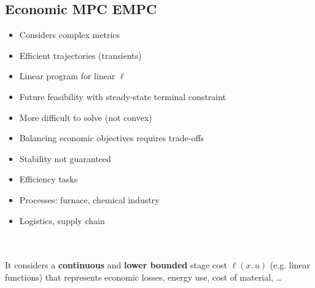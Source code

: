 \subsection{Economic MPC EMPC}
\begin{minipage}{0.33\textwidth}
    \begin{tcolorbox}[colframe=green!50!black, colback=green!5!white, title=Pros, left=0.5mm, right=0.5mm]
    \begin{itemize}[leftmargin=*]
        \item Considers complex metrics
        \item Efficient trajectories (transients)
        \item Linear program for linear $\ell$
        \item Future feasibility with steady-state terminal constraint
    \end{itemize}
    \end{tcolorbox}
\end{minipage}
\begin{minipage}{0.33\textwidth}
    \begin{tcolorbox}[colframe=red!50!black, colback=red!5!white, title=Cons, left=0.5mm, right=0.5mm]
    \begin{itemize}[leftmargin=*]
        \item More difficult to solve (not convex)
        \item Balancing economic objectives requires trade-offs
        \item Stability not guaranteed
    \end{itemize}
    \end{tcolorbox}
\end{minipage}
\begin{minipage}{0.33\textwidth}
    \begin{tcolorbox}[colframe=gray!50!black, colback=gray!5!white, title=Examples, left=0.5mm, right=0.5mm]
    \begin{itemize}[leftmargin=*]
        \item Efficiency tasks
        \item Processes: furnace, chemical industry
        \item Logistics, supply chain
    \end{itemize}
    \end{tcolorbox}
\end{minipage}\\ \\
It considers a \textbf{continuous} and \textbf{lower bounded} stage cost $\ell(x,u)$ (e.g. linear functions) that represents economic losses, energy use, cost of material, \ldots
